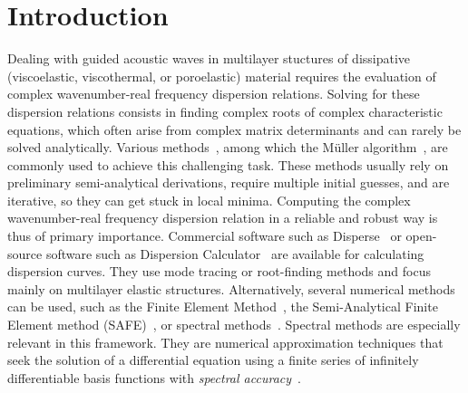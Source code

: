\begin{abstract}
    A spectral collocation method is proposed to compute the complex wavenumber-real frequency dispersion relations of guided acoustic waves in multilayer structures involving dissipative materials. The nature of these dissipative materials is initially considered to be arbitrary, i.e., poroelastic, viscoelastic, or viscoacoustic. For a given frequency, the complex wavenumbers as well as the physical fields, which are further used to evaluate the Poynting vectors and analyze the energy flux, are obtained by solving a generalized eigenvalue problem. The latter arises from a set of discretized equations of motion and appropriate boundary (coupling) conditions. These equations of motion and boundary (coupling) conditions are imposed by the nature of the material composing each layer of the structure. A focus is made on poroelastic layers. The dispersion relation of a two-layer elastic-poroelastic structure is analysed, as well as the energy flows in the structure. The results as calculated with the present spectral collocation method are validated against those obtained with a classical complex root-finding (M\"uller) method and experiments.
\end{abstract}


\section{Introduction}
\label{sec:intro_jap}
Dealing with guided acoustic waves in multilayer stuctures of dissipative (viscoelastic, viscothermal, or poroelastic) material  requires the evaluation of complex wavenumber-real frequency dispersion relations. Solving for these dispersion relations consists in finding complex roots of complex characteristic equations, which often arise from complex matrix determinants and can rarely be solved analytically. Various methods~\cite{ kowalczyk2017, dubbelday1983}, among which the Müller algorithm~\cite{muller1956}, are commonly used to achieve this challenging task. These methods usually rely on preliminary semi-analytical derivations, require multiple initial guesses, and are iterative, so they can get stuck in local minima. Computing the complex wavenumber-real frequency dispersion relation in a reliable and robust way is thus of primary importance. {Commercial software such as Disperse~\cite{pavlakovic1997} or open-source software such as Dispersion Calculator~\cite{huber2018, huber2023} are available for calculating dispersion curves. They use mode tracing or root-finding methods and focus mainly on multilayer elastic structures. Alternatively}, several numerical methods can be used, such as the Finite Element Method~\cite{treyssede2014}, the Semi-Analytical Finite Element method (SAFE)~\cite{bartoli2006, marzani2008,rose2014}, or spectral methods~\cite{canuto2006}. Spectral methods are especially relevant in this framework. They are numerical approximation techniques that seek the solution of a differential equation using a finite series of infinitely differentiable basis functions with \emph{spectral accuracy}~\cite{trefethen2000}. \\
    
